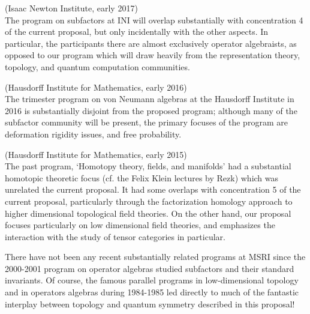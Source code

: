 \documentclass[12pt]{article}
\begin{document}
\begin{description}
  \setlength{\itemsep}{1pt}
  \setlength{\parskip}{0pt}
  \setlength{\parsep}{0pt}
\item[Subfactors and their applications \href{https://www.newton.ac.uk/event/oas}{program}] (Isaac Newton Institute, early 2017) \\
The program on subfactors at INI will overlap substantially with concentration 4 of the current proposal, but only incidentally with
the other aspects. In particular, the participants there are almost exclusively operator algebraists, as opposed to our program which will draw heavily from the representation theory, topology, and quantum computation communities.  
\item[Von Neumann algebras \href{https://www.him.uni-bonn.de/programs/future-programs/future-trimester-programs/von-neumann-algebras-2016/description/}{trimester}] (Hausdorff Institute for Mathematics, early 2016) \\
The trimester program on von Neumann algebras at the Hausdorff Institute in 2016 is substantially disjoint from
the proposed program; although many of the subfactor community will be present, the primary focuses of the program are deformation 
rigidity issues, and free probability.
\item[Homotopy theory, fields, and manifolds \href{https://www.him.uni-bonn.de/programs/past-programs/past-trimester-programs/homotopy-theory-2015/description/}{trimester}] (Hausdorff Institute for Mathematics, early 2015) \\
The past program, `Homotopy theory, fields, and manifolds' had a substantial homotopic theoretic
focus (cf. the Felix Klein lectures by Rezk) which was unrelated the current proposal. It had some overlaps with concentration 5 of the current proposal, particularly through the factorization homology approach to higher dimensional topological field theories. On the other hand, 
our proposal focuses particularly 
on low dimensional field theories, and emphasizes the interaction with the study of tensor categories in particular.
\end{description}

There have not been any recent substantially related programs at MSRI since the 2000-2001 program on operator algebras studied subfactors and their standard invariants. Of course, the famous parallel programs in low-dimensional topology and in operators algebras during 1984-1985 led directly to much of the fantastic interplay between topology and quantum symmetry described in this proposal!
\end{document}
